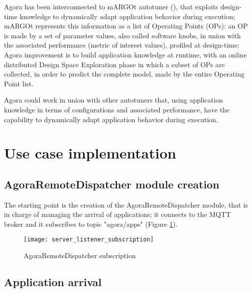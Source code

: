 Agora has been interconnected to mARGOt autotuner (\cite{gadioli2015application}), that exploits design-time knowledge to dynamically adapt application behavior during execution; mARGOt represents this information as a list of Operating Points (OPs): an OP is made by a set of parameter values, also called software knobs, in union with the associated performance (metric of interest values), profiled at design-time; Agora improvement is to build application knowledge at runtime, with an online distributed Design Space Exploration phase in which a subset of OPs are collected, in order to predict the complete model, made by the entire Operating Point list.

Agora could work in union with other autotuners that, using application knowledge in terms of configurations and associated performance, have the capability to dynamically adapt application behavior during execution.










\section{Use case implementation}





\subsection{AgoraRemoteDispatcher module creation}

The starting point is the creation of the AgoraRemoteDispatcher module, that is in charge of managing the arrival of applications; it connects to the MQTT broker and it subscribes to topic "agora/apps" (Figure \ref{fig::dispSub}).

\begin{figure}[ht]

    \centering
    \texttt{[image: server\_listener\_subscription]}
    \caption{AgoraRemoteDispatcher subscription}

    \label{fig::dispSub}
    
\end{figure}





\subsection{Application arrival}

